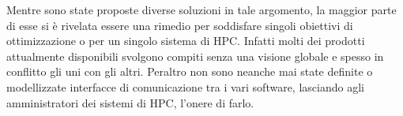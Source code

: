 Mentre sono state proposte diverse soluzioni in tale argomento, %
la maggior parte di esse si è rivelata essere una rimedio per soddisfare singoli obiettivi di ottimizzazione o per un singolo sistema di HPC. Infatti molti dei prodotti attualmente disponibili svolgono compiti senza una visione globale e spesso in conflitto gli uni con gli altri. Peraltro non sono neanche mai state definite o modellizzate interfacce di comunicazione tra i vari software, lasciando agli amministratori dei sistemi di HPC, l'onere di farlo.




